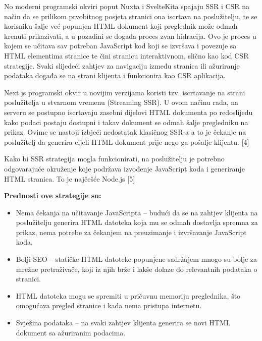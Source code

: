 \bigskip

No moderni programski okviri poput Nuxta i SvelteKita spajaju SSR i CSR na način da se prilikom prvobitnog posjeta stranici ona iscrtava na poslužitelju, te se korisniku šalje već popunjen HTML dokument koji preglednik može odmah krenuti prikazivati, a u pozadini se događa proces zvan hidracija. Ovo je proces u kojem se učitava sav potreban JavaScript kod koji se izvršava i povezuje sa HTML elementima stranice te čini stranicu interaktivnom, slično kao kod CSR strategije. Svaki slijedeći zahtjev za navigaciju između stranica ili ažuriranje podataka događa se na strani klijenta i funkcionira kao CSR aplikacija.

\bigskip

Next.js programski okvir u novijim verzijama koristi tzv. iscrtavanje na strani poslužitelja u stvarnom vremenu (Streaming SSR). U ovom načinu rada, na serveru se postupno iscrtavaju zasebni dijelovi HTML dokumenta po redoslijedu kako podaci postaju dostupni i takav dokument se odmah šalje pregledniku na prikaz. Ovime se nastoji izbjeći nedostatak klasičnog SSR-a a to je čekanje na poslužitelj da generira cijeli HTML dokument prije nego ga pošalje klijentu.  [4]

\bigskip

Kako bi SSR strategija mogla funkcionirati, na poslužitelju je potrebno odgovarajuće okruženje koje podržava izvođenje JavaScript koda i generiranje HTML stranica. To je najčešće Node.js [5]

\bigskip

\textbf{Prednosti ove strategije su:}

\begin{itemize}
    \item Nema čekanja na učitavanje JavaScripta – budući da se na zahtjev klijenta na poslužitelju generira HTML datoteka koja mu se odmah dostavlja spremna za prikaz, nema potrebe za čekanjem na preuzimanje i izvršavanje JavaScript koda.
    \item Bolji SEO – statičke HTML datoteke popunjene sadržajem mnogo su bolje za mrežne pretraživače, koji iz njih brže i lakše dolaze do relevantnih podataka o stranici.
    \item HTML datoteka mogu se spremiti u pričuvnu memoriju preglednika, što omogućava pregled stranice i kada nema pristupa internetu.
    \item Svježina podataka – na svaki zahtjev klijenta generira se novi HTML dokument sa ažuriranim podacima.
\end{itemize}

